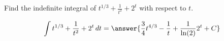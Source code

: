 \documentclass{ximera}
\author{Gregory Hartman \and Matthew Carr}
\begin{document}
\begin{exercise}

Find the indefinite integral of $t^{1/3}+\frac{1}{t^2}+2^t$ with respect to $t$.
\begin{prompt}
  \[
  \int t^{1/3}+\frac{1}{t^2}+2^t\d t
  =\answer{\frac{3}{4}t^{4/3}-\frac{1}{t}+\frac{1}{\ln(2)}2^{t}+C}
  \]
\end{prompt}
\end{exercise}
\end{document}
